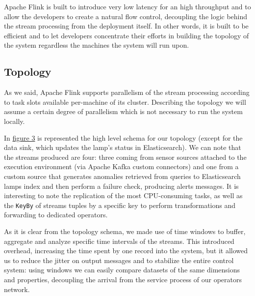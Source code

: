 Apache Flink is built to introduce very low latency for an high throughput and to allow the developers to create a natural flow control, decoupling the logic behind the stream processing from the deployment itself. In other words, it is built to be efficient and to let developers concentrate their efforts in building the topology of the system regardless the machines the system will run upon.

\subsection{Topology}
As we said, Apache Flink supports parallelism of the stream processing according to task slots available per-machine of its cluster. Describing the topology we will assume a certain degree of parallelism which is not necessary to run the system locally.

In \hyperref[fig:ember_topology]{figure 3} is represented the high level schema for our topology (except for the data sink, which updates the lamp's status in Elasticsearch). We can note that the streams produced are four: three coming from sensor sources attached to the execution environment (via Apache Kafka custom connectors) and one from a custom source that generates anomalies retrieved from queries to Elasticsearch lamps index and then perform a failure check, producing alerts messages.
It is interesting to note the replication of the most CPU-consuming tasks, as well as the \texttt{KeyBy} of streams tuples by a specific key to perform transformations and forwarding to dedicated operators.

As it is clear from the topology schema, we made use of time windows to buffer, aggregate and analyze specific time intervals of the streams. This introduced overhead, increasing the time spent by one record into the system, but it allowed us to reduce the jitter on output messages and to stabilize the entire control system: using windows we can easily compare datasets of the same dimensions and properties, decoupling the arrival from the service process of our operators network.

